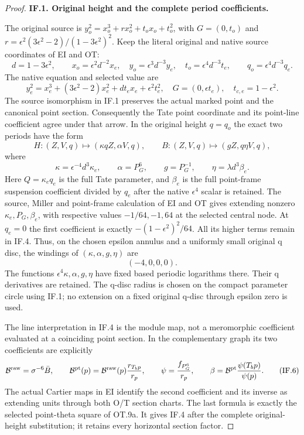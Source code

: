 \begin{proof}
\par\medskip\noindent\textbf{IF.1. Original height and the complete period coefficients.}\par\nopagebreak[4]

The original source is
\(y_o^2=x_o^3+r x_o^2+t_o x_o+t_o^2\), with
\(G=(0,t_o)\) and
\(r=\epsilon^2(3\epsilon^2-2)/(1-3\epsilon^2)^2\).
Keep the literal original and native source coordinates of EI and OT:
\[
 d=1-3\epsilon^2,\qquad
 x_o=\epsilon^2d^{-2}x_e,\quad
 y_o=\epsilon^3d^{-3}y_e,\quad
 t_o=\epsilon^4d^{-3}t_e,
 \qquad q_o=\epsilon^4d^{-3}q_e.
 \tag{IF.1}
\]
The native equation and selected value are
\[
 y_e^2=x_e^3+(3\epsilon^2-2)x_e^2+d t_e x_e+\epsilon^2t_e^2,
 \quad G=(0,\epsilon t_e),\quad t_{c,e}=1-\epsilon^2.
 \tag{IF.2}
\]
The source isomorphism in IF.1 preserves the actual marked point and
the canonical point section.  Consequently the Tate point coordinate
and its point-line coefficient agree under that arrow.  In the original
height \(q=q_o\) the exact two periods have the form
\[
 H:(Z,V,q)\longmapsto(\kappa qZ,\alpha V,q),\qquad
 B:(Z,V,q)\longmapsto(gZ,q\eta V,q),
 \tag{IF.3}
\]
where
\[
 \kappa=\epsilon^{-4}d^3\kappa_e,\qquad
 \alpha=P_G^6,\qquad g=P_G^{-1},\qquad
 \eta=\lambda d^3\beta_e.
 \tag{IF.4}
\]
Here \(Q=\kappa_e q_e\) is the full Tate parameter, and \(\beta_e\) is
the full point-frame suspension coefficient divided by \(q_e\) after the
native \(\epsilon^4\) scalar is retained.  The source, Miller and
point-frame calculation of EI and OT gives extending nonzero
\(\kappa_e,P_G,\beta_e\), with respective values
\(-1/64,-1,64\) at the selected central node.  At \(q_e=0\) the first
coefficient is exactly \(-(1-\epsilon^2)^2/64\).  All its higher
terms remain in IF.4.  Thus, on the chosen epsilon annulus and a
uniformly small original q disc, the windings of
\((\kappa,\alpha,g,\eta)\) are
\[
                         (-4,0,0,0).
 \tag{IF.5}
\]
The functions \(\epsilon^4\kappa,\alpha,g,\eta\) have fixed based
periodic logarithms there.  Their q derivatives are retained.  The
q-disc radius is chosen on the compact parameter circle using IF.1;
no extension on a fixed original q-disc through epsilon zero is used.

The line interpretation in IF.4 is the module map, not a meromorphic
coefficient evaluated at a coinciding point section.  In the
complementary graph its two coefficients are explicitly
\[
 \mathcal B^{\rm raw}=\sigma^{-6}\bar B,\qquad
 \mathcal B^{\rm pt}(p)=\mathcal B^{\rm raw}(p)
                          \frac{r_{T_bp}}{r_p},\qquad
 \psi=\frac{f_{P_G^6}}{r_p},\qquad
 \beta=\mathcal B^{\rm pt}\frac{\psi(T_bp)}{\psi(p)}.
 \tag{IF.6}
\]
The actual Cartier maps in EI identify the second coefficient and its
inverse as extending units through both O/T section charts.  The last
formula is exactly the selected point-theta square of OT.9a.  It gives
IF.4 after the complete original-height substitution; it retains every
horizontal section factor.


\end{proof}
